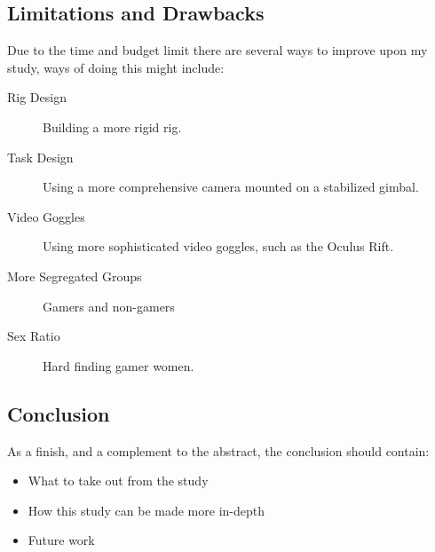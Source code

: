 \documentclass[runningheads,a4paper,oribibl]{llncs}
\begin{document}
\subsection{Limitations and Drawbacks}
Due to the time and budget limit there are several ways to improve upon my study, ways of doing this might include:
\begin{description}
	\item[Rig Design] Building a more rigid rig.
	\item[Task Design] Using a more comprehensive camera mounted on a stabilized gimbal.
	\item[Video Goggles] Using more sophisticated video goggles, such as the Oculus Rift.
	\item[More Segregated Groups] Gamers and non-gamers
	\item[Sex Ratio] Hard finding gamer women.
\end{description}




\subsection{Conclusion}
As a finish, and a complement to the abstract, the conclusion should contain:
\begin{itemize}
	\item What to take out from the study
	\item How this study can be made more in-depth
	\item Future work
\end{itemize}











\end{document}
